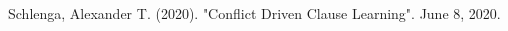 \begin{thebibliography}{99}

Schlenga, Alexander T. (2020). "Conflict Driven Clause Learning". June 8, 2020.



\end{thebibliography}
